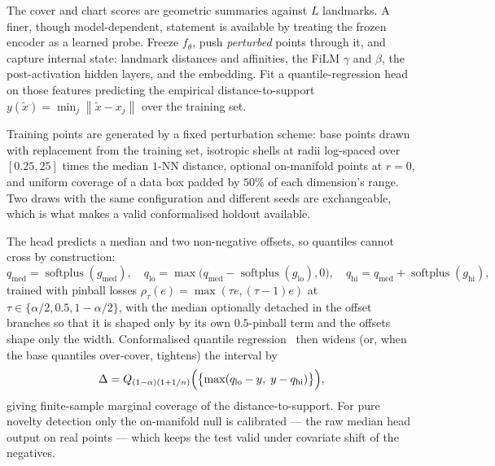 \documentclass[12pt]{iopart}
\theoremstyle{definition}
\theoremstyle{plain}
\theoremstyle{remark}
\newcommand{\norm}[1]{\left\lVert#1\right\rVert}
\DeclareMathOperator{\softplus}{softplus}
\begin{document}
The cover and chart scores are geometric summaries against $L$ landmarks. A
finer, though model-dependent, statement is available by treating the frozen
encoder as a learned probe. Freeze $f_\theta$, push \emph{perturbed} points
through it, and capture internal state: landmark distances and affinities, the
FiLM $\gamma$ and $\beta$, the post-activation hidden layers, and the embedding.
Fit a quantile-regression head on those features predicting the empirical
distance-to-support $y(\tilde x)=\min_j\norm{\tilde x - x_j}$ over the training
set.

Training points are generated by a fixed perturbation scheme: base points drawn
with replacement from the training set, isotropic shells at radii log-spaced
over $[0.25,25]$ times the median $1$-NN distance, optional on-manifold points
at $r=0$, and uniform coverage of a data box padded by $50\%$ of each
dimension's range. Two draws with the same configuration and different seeds
are exchangeable, which is what makes a valid conformalised holdout available.

The head predicts a median and two non-negative offsets, so quantiles cannot
cross by construction:
\begin{equation}
\label{eq:qhead}
q_{\mathrm{med}} = \softplus(g_{\mathrm{med}}),
\quad
q_{\mathrm{lo}} = \max\!\bigl(q_{\mathrm{med}}-\softplus(g_{\mathrm{lo}}),0\bigr),
\quad
q_{\mathrm{hi}} = q_{\mathrm{med}}+\softplus(g_{\mathrm{hi}}),
\end{equation}
trained with pinball losses
$\rho_\tau(e)=\max(\tau e,(\tau-1)e)$ at $\tau\in\{\alpha/2,0.5,1-\alpha/2\}$,
with the median optionally detached in the offset branches so that it is shaped
only by its own $0.5$-pinball term and the offsets shape only the width.
Conformalised quantile regression~\cite{romano2019cqr} then widens (or, when
the base quantiles over-cover, tightens) the interval by
\begin{equation}
\label{eq:cqr}
\Delta
=
Q_{(1-\alpha)(1+1/n)}\Bigl(\bigl\{\max(q_{\mathrm{lo}}-y,\;y-q_{\mathrm{hi}})\bigr\}\Bigr),
\end{equation}
giving finite-sample marginal coverage of the distance-to-support. For pure
novelty detection only the on-manifold null is calibrated --- the raw median
head output on real points --- which keeps the test valid under covariate shift
of the negatives.
\end{document}
